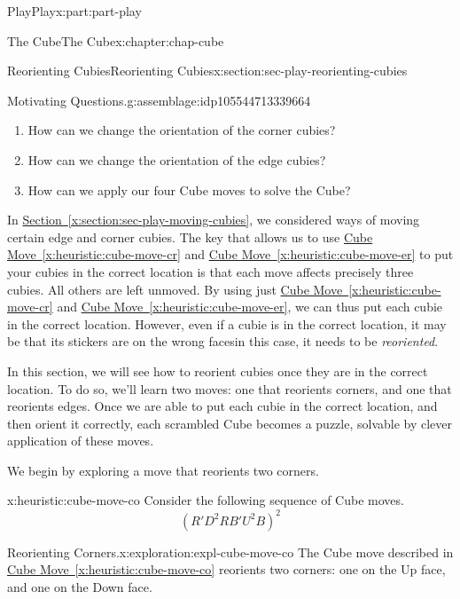 \documentclass[oneside,10pt,]{book}
\newcommand{\xreffont}{\relax}
\numberwithin{equation}{section}
\begin{document}
\begin{partptx}{Play}{}{Play}{}{}{x:part:part-play}
\begin{chapterptx}{The Cube}{}{The Cube}{}{}{x:chapter:chap-cube}
\begin{sectionptx}{Reorienting Cubies}{}{Reorienting Cubies}{}{}{x:section:sec-play-reorienting-cubies}
\begin{assemblage}{Motivating Questions.}{g:assemblage:idp105544713339664}
\begin{enumerate}
\item{}How can we change the orientation of the corner cubies?%
\item{}How can we change the orientation of the edge cubies?%
\item{}How can we apply our four Cube moves to solve the Cube?%
\end{enumerate}
%
\end{assemblage}
\begin{introduction}{}%
In \hyperref[x:section:sec-play-moving-cubies]{Section~{\xreffont\ref{x:section:sec-play-moving-cubies}}}, we considered ways of moving certain edge and corner cubies. The key that allows us to use \hyperref[x:heuristic:cube-move-cr]{Cube Move~{\xreffont\ref{x:heuristic:cube-move-cr}}} and \hyperref[x:heuristic:cube-move-er]{Cube Move~{\xreffont\ref{x:heuristic:cube-move-er}}} to put your cubies in the correct location is that each move affects precisely three cubies. All others are left unmoved. By using just \hyperref[x:heuristic:cube-move-cr]{Cube Move~{\xreffont\ref{x:heuristic:cube-move-cr}}} and \hyperref[x:heuristic:cube-move-er]{Cube Move~{\xreffont\ref{x:heuristic:cube-move-er}}}, we can thus put each cubie in the correct location. However, even if a cubie is in the correct location, it may be that its stickers are on the wrong faces\textemdash{}in this case, it needs to be \emph{reoriented}.%
\par
In this section, we will see how to reorient cubies once they are in the correct location. To do so, we'll learn two moves: one that reorients corners, and one that reorients edges. Once we are able to put each cubie in the correct location, and then orient it correctly, each scrambled Cube becomes a puzzle, solvable by clever application of these moves.%
\end{introduction}%
We begin by exploring a move that reorients two corners.%
\begin{heuristic}{}{}{x:heuristic:cube-move-co}%
%
Consider the following sequence of Cube moves.%
%
\begin{equation*}
(R' D^2 R B' U^2 B)^2
\end{equation*}
\end{heuristic}
\begin{exploration}{Reorienting Corners.}{x:exploration:expl-cube-move-co}%
The Cube move described in \hyperref[x:heuristic:cube-move-co]{Cube Move~{\xreffont\ref{x:heuristic:cube-move-co}}} reorients two corners: one on the Up face, and one on the Down face.%
%
\begin{enumerate}

\end{enumerate}
\end{exploration}
\end{sectionptx}
\end{chapterptx}
\end{partptx}
\end{document}
